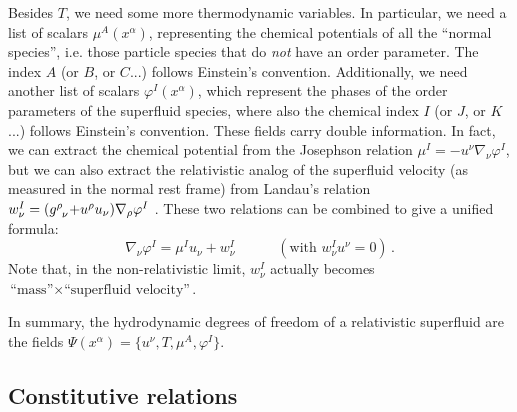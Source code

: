 \documentclass[a4paper, amsfonts, amssymb, amsmath, reprint, showkeys, nofootinbib, twoside,notitlepage,onecolumn]{revtex4-2}
\newcommand{\spc}{\quad \quad \quad}
\theoremstyle{definition}
\theoremstyle{theorem}
\theoremstyle{corollary}
\begin{document}
Besides $T$, we need some more thermodynamic variables. In particular, we need a list of scalars $\mu^A(x^\alpha)$, representing the chemical potentials of all the ``normal species'', i.e. those particle species that do \textit{not} have an order parameter. The index $A$ (or $B$, or $C$...) follows Einstein's convention.
Additionally, we need another list of scalars $\varphi^I(x^\alpha)$, which represent the phases of the order parameters of the superfluid species, where also the chemical index $I$ (or $J$, or $K$...) follows Einstein's convention. These fields carry double information. In fact, we can extract the chemical potential from the Josephson relation $\mu^I=-u^\nu \nabla_\nu \varphi^I$, but we can also extract the relativistic analog of the superfluid velocity (as measured in the normal rest frame) from Landau's relation $w^I_\nu =(g\indices{^\rho _\nu}{+}u^\rho u_\nu)\nabla_\rho \varphi^I$ \cite[\S 26]{landau9}. These two relations can be combined to give a unified formula:
\begin{equation}\label{nablphii}
\nabla_\nu \varphi^I =\mu^I u_\nu +w^I_\nu \spc (\text{with } w^I_\nu u^\nu =0) \, .
\end{equation}
Note that, in the non-relativistic limit, $w^I_\nu$ actually becomes $\text{``mass''}\times\text{``superfluid velocity''}$. 

In summary, the hydrodynamic degrees of freedom of a relativistic superfluid are the fields $\Psi(x^\alpha)=\{u^\nu,T,\mu^A,\varphi^I\}$. 

\vspace{-0.2cm}
\subsection{Constitutive relations}\label{costitutzionerobusta}
\vspace{-0.2cm}
\end{document}
